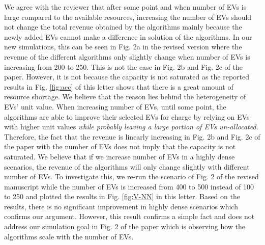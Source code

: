 \documentclass[11pt]{article}
\newcommand{\rev}[1]{{\color{black}#1}}%
\newcommand{\rev}[1]{#1}
\begin{document}
We agree with the reviewer that after some point and when number of EVs is large compared to the available resources, increasing the number of EVs should not change the total revenue obtained by the algorithms mainly because the newly added EVs cannot make a difference in solution of the algorithms. In our new simulations, this can be seen in Fig. 2a in the revised version where the revenue of the different algorithms only slightly change when number of EVs is increasing from 200 to 250. This is not the case in Fig. 2b and Fig. 2c of the paper. However, it is not because the capacity is not saturated as the reported results in Fig. \ref{fig:acc} of this letter shows that there is a great amount of resource shortage. We believe that the reason lies behind the heterogeneity of EVs' unit value. When increasing number of EVs, until some point, the algorithms are able to improve their selected EVs for charge by relying on EVs with higher unit values \emph{while probably leaving a large portion of EVs un-allocated.} Therefore, the fact that the revenue is linearly increasing in Fig. 2b and Fig. 2c of the paper with the number of EVs does not imply that the capacity is not saturated. 
We believe that if we increase number of EVs in a highly dense scenarios, the revenue of the algorithms will only change slightly with different number of EVs. \rev{To investigate this, we re-run the scenario of Fig. 2 of the revised manuscript while the number of EVs is increased from 400 to 500 instead of 100 to 250 and plotted the results in Fig. \ref{fig:V-NN} in this letter. Based on the results, there is no significant improvement in highly dense scenarios which confirms our argument.} However, this result confirms a simple fact and does not address our simulation goal in Fig. 2 of the paper which is observing how the algorithms scale with the number of EVs.
\end{document}
